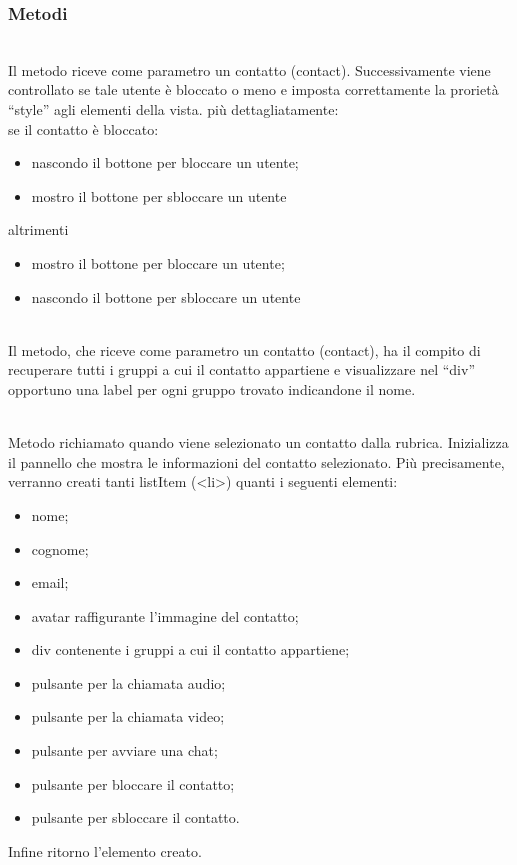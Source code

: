 \subsubsection*{Metodi}
\begin{description}
\item{}\\
	Il metodo riceve come parametro un contatto (contact). Successivamente viene controllato se tale utente è bloccato o meno e imposta correttamente la prorietà ``style'' agli elementi della vista. più dettagliatamente:\\
se il contatto è bloccato:
\begin{itemize}
\item nascondo il bottone per bloccare un utente;
\item mostro il bottone per sbloccare un utente
\end{itemize}
altrimenti\\
\begin{itemize}
\item mostro il bottone per bloccare un utente;
\item nascondo il bottone per sbloccare un utente
\end{itemize}


\item{}\\
Il metodo, che riceve come parametro un contatto (contact), ha il compito di recuperare tutti i gruppi 
 a cui il contatto appartiene e visualizzare nel ``div'' opportuno una label per ogni gruppo trovato indicandone il nome. 

\item{}\\
Metodo richiamato quando viene selezionato un contatto dalla rubrica. Inizializza il pannello che mostra le informazioni del contatto selezionato. Più precisamente, verranno creati tanti listItem (<li>) quanti i seguenti elementi:
\begin{itemize}
\item nome;
\item cognome;
\item email;
\item avatar raffigurante l'immagine del contatto;
\item div contenente i gruppi a cui il contatto appartiene;
\item pulsante per la chiamata audio;
\item pulsante per la chiamata video;
\item pulsante per avviare una chat;
\item pulsante per bloccare il contatto;
\item pulsante per sbloccare il contatto.
\end{itemize}
Infine ritorno l'elemento creato.
	

\end{description}

